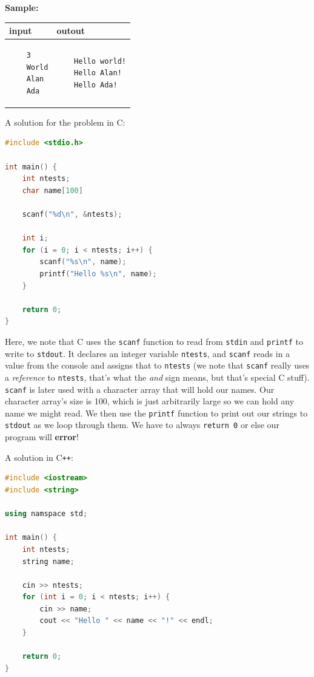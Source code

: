 \documentclass[a4paper]{article}
\begin{document}
\textbf{Sample:}

\begin{tabular}{|p{}|p{}|}
    \hline
    \textbf{input} & \textbf{outout} \\
    \hline
    \begin{verbatim}
    3
    World
    Alan
    Ada
    \end{verbatim} &
    \begin{verbatim}
    Hello world!
    Hello Alan!
    Hello Ada!
    \end{verbatim} \\
    \hline
\end{tabular}
\newpage

A solution for the problem in C:
\begin{lstlisting}[language=C]
#include <stdio.h>

int main() {
    int ntests;
    char name[100]

    scanf("%d\n", &ntests);

    int i;
    for (i = 0; i < ntests; i++) {
        scanf("%s\n", name);
        printf("Hello %s\n", name);
    }

    return 0;
}
\end{lstlisting}

Here, we note that C uses the \texttt{scanf} function to read from \texttt{stdin} and \texttt{printf} to write to \texttt{stdout}. It declares an integer variable \texttt{ntests}, and \texttt{scanf} reads in a value from the console and assigns that to \texttt{ntests} (we note that \texttt{scanf} really uses a \textit{reference} to \texttt{ntests}, that's what the \textit{and} sign means, but that's special C stuff). \texttt{scanf} is later used with a character array that will hold our names. Our character array's size is 100, which is just arbitrarily large so we can hold any name we might read. We then use the \texttt{printf} function to print out our strings to \texttt{stdout} as we loop through them. We have to always \texttt{return 0} or else our program will \textbf{error}! 

A solution in C\texttt{++}:
\begin{lstlisting}[language=C++]
#include <iostream>
#include <string>

using namspace std;

int main() {
    int ntests;
    string name;

    cin >> ntests;
    for (int i = 0; i < ntests; i++) {
        cin >> name;
        cout << "Hello " << name << "!" << endl;
    }

    return 0;
}
\end{lstlisting}
\end{document}
